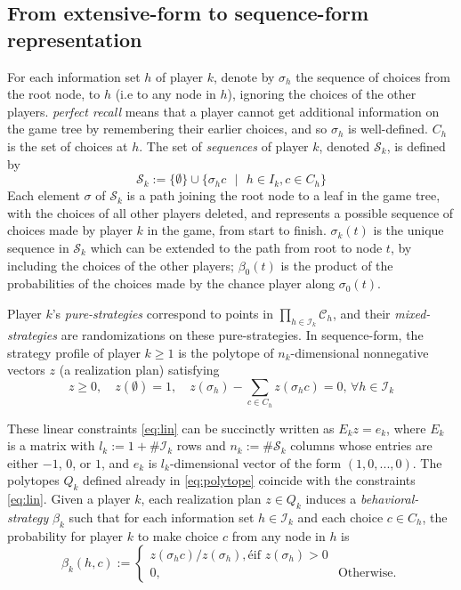 \documentclass{article} %
\begin{document}
\subsection{From extensive-form to sequence-form representation}
For each information set $h$ of player $k$, denote by $\sigma_h$  the sequence of choices from the root node, to $h$ (i.e to any node in $h$), ignoring the choices of the other players. \textit{perfect recall} means that a player cannot get additional information on the game tree by remembering their earlier choices, and so $\sigma_h$ is well-defined. $C_h$ is the set of choices at $h$. The set of \textit{sequences} of player $k$, denoted $\mathcal{S}_k$, is defined by 
\begin{equation}
\mathcal{S}_k := \{\emptyset\} \cup \{\sigma_h c\text{ } |\text{ } h \in I_k, c \in C_h\}
\end{equation}
Each element $\sigma$ of $\mathcal{S}_k$ is a path joining the root node to a leaf in the game tree, with the choices of all other players deleted, and represents a possible sequence of choices made by player $k$ in the game, from start to finish. $\sigma_k(t)$ is the unique sequence in $\mathcal{S}_k$ which can be extended to the path from root to node $t$, by including the choices of the other players;
$\beta_0(t)$ is the product of the probabilities of the choices made by the chance player along $\sigma_0(t)$.

Player $k$'s \textit{pure-strategies} correspond to points in $\prod_{h \in \mathcal{I}_k}{\mathcal{C}_h}$, and their \textit{mixed-strategies} are randomizations on these pure-strategies. In sequence-form, the strategy profile of player $k \ge 1$ is the polytope of $n_k$-dimensional nonnegative vectors $z$ (a realization plan) satisfying
\begin{equation}
  z \geq 0,\hspace{1em}z(\emptyset) = 1,\hspace{1em}
    z(\sigma_h) - \sum_{c \in C_h}{z(\sigma_h c)} = 0\text{, } \forall h \in \mathcal{I}_k
  \label{eq:lin}
\end{equation}

These linear constraints \eqref{eq:lin} can be succinctly written as $E_k z = e_k$,
where $E_k$ is a matrix with $l_k := 1 + \#\mathcal{I}_k$ rows and $n_k := \#\mathcal{S}_k$ columns whose entries are either $-1$, $0$, or $1$, and $e_k$ is $l_k$-dimensional vector of the form $(1, 0, ..., 0)$. The polytopes $Q_k$ defined already in \eqref{eq:polytope} coincide with the constraints \eqref{eq:lin}. Given a player $k$, each realization plan $z \in Q_k$ induces a \textit{behavioral-strategy} $\beta_k$ such that for each information set $h \in \mathcal{I}_k$ and each choice $c \in C_h$, the probability for player $k$ to make choice $c$ from any node in $h$ is
\begin{equation}
  \beta_k(h, c) := \begin{cases}
    z(\sigma_hc)/z(\sigma_h), é\mbox{if } z(\sigma_h) > 0\\
    0, &\mbox{Otherwise}.
  \end{cases}
\end{equation}
\end{document}
